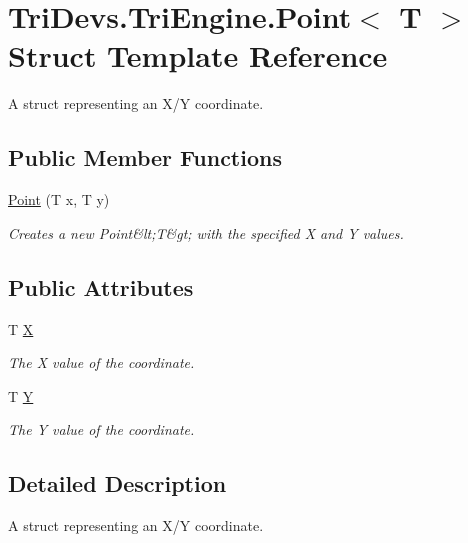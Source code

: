 \hypertarget{struct_tri_devs_1_1_tri_engine_1_1_point_3_01_t_01_4}{\section{Tri\-Devs.\-Tri\-Engine.\-Point$<$ T $>$ Struct Template Reference}
\label{struct_tri_devs_1_1_tri_engine_1_1_point_3_01_t_01_4}
}


A struct representing an X/\-Y coordinate.  


\subsection*{Public Member Functions}
\begin{DoxyCompactItemize}
\item 
\hyperlink{struct_tri_devs_1_1_tri_engine_1_1_point_3_01_t_01_4_acaa754e7e4d55407811d9dd146fa4856}{Point} (T x, T y)
\begin{DoxyCompactList}\small\item\em Creates a new Point\&lt;\-T\&gt; with the specified X and Y values. \end{DoxyCompactList}\end{DoxyCompactItemize}
\subsection*{Public Attributes}
\begin{DoxyCompactItemize}
\item 
T \hyperlink{struct_tri_devs_1_1_tri_engine_1_1_point_3_01_t_01_4_a6cf67ed6637a21f67470f388f0b4fe74}{X}
\begin{DoxyCompactList}\small\item\em The X value of the coordinate. \end{DoxyCompactList}\item 
T \hyperlink{struct_tri_devs_1_1_tri_engine_1_1_point_3_01_t_01_4_a1af61f477e5af56a1add14b354d8795a}{Y}
\begin{DoxyCompactList}\small\item\em The Y value of the coordinate. \end{DoxyCompactList}\end{DoxyCompactItemize}


\subsection{Detailed Description}
A struct representing an X/\-Y coordinate. 


